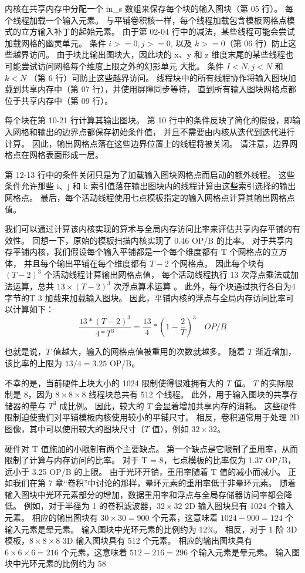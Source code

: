 内核在共享内存中分配一个 in\_s 数组来保存每个块的输入图块（第 05 行）。 每个线程加载一个输入元素。 
与平铺卷积核一样，每个线程加载包含模板网格点模式的立方输入补丁的起始元素。 
由于第 02-04 行中的减法，某些线程可能会尝试加载网格的幽灵单元。 
条件 $i >=0, j>= 0$, 以及 $k >= 0$（第 06 行）防止这些越界访问。 
由于块比输出图块大，因此块的 x、y 和 z 维度末尾的某些线程也可能尝试访问网格每个维度上限之外的幻影单元 大批。 
条件 $I < N, j < N$ 和 $k < N$ （第 6 行）可防止这些越界访问。 
线程块中的所有线程协作将输入图块加载到共享内存中（第 07 行），并使用屏障同步等待，
直到所有输入图块网格点都位于共享内存中（第 09 行）。

每个块在第 10-21 行计算其输出图块。 第 10 行中的条件反映了简化的假设，即输入网格和输出的边界点都保存初始条件值，
并且不需要由内核从迭代到迭代进行计算。 因此，输出网格点落在这些边界位置上的线程将被关闭。 
请注意，边界网格点在网格表面形成一层。

第 12-13 行中的条件关闭只是为了加载输入图块网格点而启动的额外线程。 
这些条件允许那些 i、j 和 k 索引值落在输出图块内的线程计算由这些索引选择的输出网格点。 
最后，每个活动线程使用七点模板指定的输入网格点计算其输出网格点值。

我们可以通过计算该内核实现的算术与全局内存访问比率来评估共享内存平铺的有效性。 
回想一下，原始的模板扫描内核实现了 0.46 OP/B 的比率。 
对于共享内存平铺内核，我们假设每个输入平铺都是一个每个维度都有 T 个网格点的立方体，
并且每个输出平铺在每个维度都有 $T - 2$ 个网格点。 
因此每个块有 $(T - 2)^3$ 个活动线程计算输出网格点值，
每个活动线程执行 13 次浮点乘法或加法运算，总共 $13 \times (T - 2)^3$ 次浮点算术运算 。 
此外，每个块通过执行各自为4字节的T 3 加载来加载输入图块。 因此，平铺内核的浮点与全局内存访问比率可以计算如下：
$$
\frac{13 *(T-2)^{3}}{4 * T^{3}}=\frac{13}{4} *\left(1-\frac{2}{T}\right)^{3} \quad O P / B
$$

也就是说，$T$ 值越大，输入的网格点值被重用的次数就越多。 随着 $T$ 渐近增加，该比率的上限为 $13/4 = 3.25$ OP/B。

不幸的是，当前硬件上块大小的 1024 限制使得很难拥有大的 $T$ 值。 
$T$ 的实际限制是 8，因为 $8 \times 8 \times 8$ 线程块总共有 512 个线程。 
此外，用于输入图块的共享存储器的量与 $T^3$ 成比例。 
因此，较大的 $T$ 会显着增加共享内存的消耗。 这些硬件限制迫使我们对平铺模板内核使用较小的平铺尺寸。 
相反，卷积通常用于处理 2D 图像，其中可以使用较大的图块尺寸（$T$ 值），例如 $32 \times 32$。

硬件对 T 值施加的小限制有两个主要缺点。 第一个缺点是它限制了重用率，从而限制了计算与内存访问的比率。 
对于 T = 8，七点模板的比率仅为 1.37 OP/B，远小于 3.25 OP/B 的上限。 由于光环开销，重用率随着 T 值的减小而减小。 
正如我们在第 7 章“卷积”中讨论的那样，晕环元素的重用率低于非晕环元素。 
随着输入图块中光环元素部分的增加，数据重用率和浮点与全局存储器访问率都会降低。 
例如，对于半径为 1 的卷积滤波器，$32 \times 32$ 2D 输入图块具有 1024 个输入元素。 
相应的输出图块有 $30 \times 30 = 900$ 个元素，这意味着 $1024 - 900 = 124$ 个输入元素是晕元素。 
输入图块中光环元素的比例约为 12\%。 相反，对于 1 阶 3D 模板，$8 \times 8 \times 8$ 3D 输入图块具有 512 个元素。 
相应的输出图块具有 $6 \times 6 \times 6 = 216$ 个元素，这意味着 $512 - 216 = 296$ 个输入元素是晕元素。 
输入图块中光环元素的比例约为 58%


